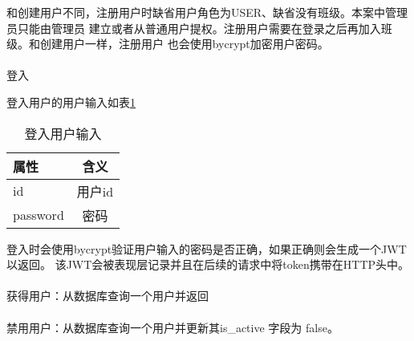 和创建用户不同，注册用户时缺省用户角色为USER、缺省没有班级。本案中管理员只能由管理员
建立或者从普通用户提权。注册用户需要在登录之后再加入班级。和创建用户一样，注册用户
也会使用bycrypt加密用户密码。

\paragraph{}登入

登入用户的用户输入如表\ref{sign_in_in}
\begin{table}[htpb!]
    \centering
    \caption{\label{sign_in_in}登入用户输入}
    \begin{threeparttable}
        \begin{tabular}{lc}
            \toprule
            属性          & 含义     \\
            \midrule
            id            & 用户id   \\
            password      & 密码     \\
            \bottomrule
        \end{tabular}
    \end{threeparttable}
\end{table}

登入时会使用bycrypt验证用户输入的密码是否正确，如果正确则会生成一个JWT以返回。
该JWT会被表现层记录并且在后续的请求中将token携带在HTTP头中。

\paragraph{}获得用户：从数据库查询一个用户并返回

\paragraph{}禁用用户：从数据库查询一个用户并更新其is\_active 字段为 false。
